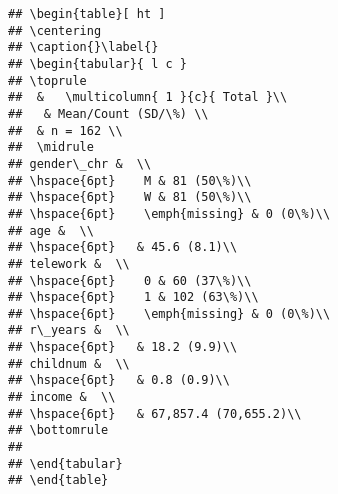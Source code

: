 \documentclass[
]{article}
\begin{document}
\begin{verbatim}
## \begin{table}[ ht ] 
## \centering 
## \caption{}\label{}
## \begin{tabular}{ l c }
## \toprule
##  &   \multicolumn{ 1 }{c}{ Total }\\ 
##   & Mean/Count (SD/\%) \\ 
##  & n = 162 \\ 
##  \midrule
## gender\_chr &  \\ 
## \hspace{6pt}    M & 81 (50\%)\\ 
## \hspace{6pt}    W & 81 (50\%)\\ 
## \hspace{6pt}    \emph{missing} & 0 (0\%)\\ 
## age &  \\ 
## \hspace{6pt}   & 45.6 (8.1)\\ 
## telework &  \\ 
## \hspace{6pt}    0 & 60 (37\%)\\ 
## \hspace{6pt}    1 & 102 (63\%)\\ 
## \hspace{6pt}    \emph{missing} & 0 (0\%)\\ 
## r\_years &  \\ 
## \hspace{6pt}   & 18.2 (9.9)\\ 
## childnum &  \\ 
## \hspace{6pt}   & 0.8 (0.9)\\ 
## income &  \\ 
## \hspace{6pt}   & 67,857.4 (70,655.2)\\ 
## \bottomrule
## 
## \end{tabular}
## \end{table}
\end{verbatim}
\end{document}
